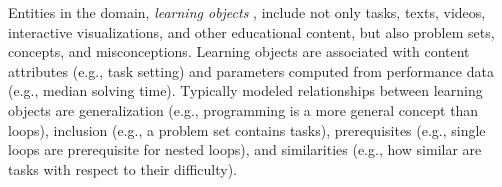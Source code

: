 Entities in the domain, \emph{learning objects} \cite{learning-objects}, %
include not only tasks, texts, videos, interactive visualizations,
and other educational content,
but also problem sets, concepts, and misconceptions.
Learning objects are associated with content attributes (e.g., task setting)
and parameters computed from performance data (e.g., median solving time).
Typically modeled relationships between learning objects are
generalization (e.g., programming is a more general concept than loops),
inclusion (e.g., a problem set contains tasks),
prerequisites (e.g., single loops are prerequisite for nested loops),
and similarities (e.g., how similar are tasks with respect to their difficulty).


